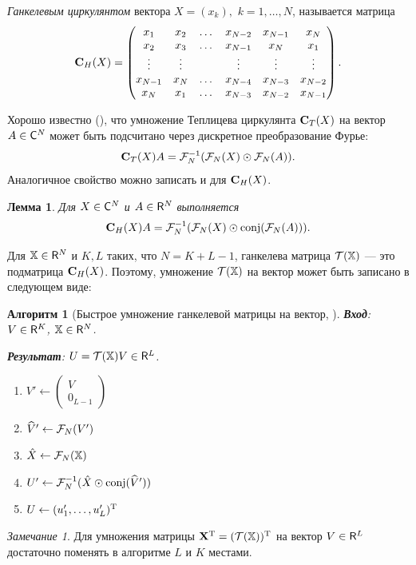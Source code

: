 \documentclass[12pt, specialist, subf,href,colorlinks=true,substylefile = spbu.rtx]{disser}
\newtheorem{algorithm}{Алгоритм}
\newtheorem{lemma}{Лемма}
\theoremstyle{remark}
\newtheorem{remark}{Замечание}
\theoremstyle{definition}
\begin{document}
\emph{Ганкелевым циркулянтом} вектора $X=(x_k),$ $k = 1, \ldots, N$, называется матрица
\begin{equation*}
\mathbf{C}_H(X) = \begin{pmatrix}
x_1 & x_2 & \dots & x_{N-2} & x_{N-1} & x_N \\ 
x_2 & x_3 & \dots & x_{N-1} & x_N & x_1 \\ 
\vdots & \vdots &  & \vdots  & \vdots & \vdots \\ 
x_{N-1} & x_N & \dots & x_{N-4} & x_{N-3} & x_{N-2} \\ 
x_N & x_1 & \dots & x_{N-3} & x_{N-2} & x_{N-1}
\end{pmatrix}.
\end{equation*}

Хорошо известно (\cite{Korobeynikov2010}), что умножение Теплицева циркулянта $\mathbf{C}_T(X)$ на вектор $A \in \mathsf{C}^N$ может быть подсчитано через дискретное преобразование Фурье:
\begin{equation*}
\mathbf{C}_T(X) A = \mathcal{F}_N^{-1}(\mathcal{F}_N(X) \odot \mathcal{F}_N(A)).
\end{equation*}
Аналогичное свойство можно записать и для $\mathbf{C}_H(X)$.
\begin{lemma}{\cite{Golyandina2013a}}
	Для $X \in \mathsf{C}^N$ и $A \in \mathsf{R}^N$ выполняется
	\begin{equation*}
	\mathbf{C}_H(X) A = \mathcal{F}_N^{-1}(\mathcal{F}_N(X) \odot \text{conj}(\mathcal{F}_N(A))).
	\end{equation*}
\end{lemma}

Для $\mathbb{X} \in \mathsf{R}^N$ и $K, L$ таких, что $N = K + L - 1$, ганкелева матрица $\mathcal{T}(\mathbb{X})$ --- это подматрица $\mathbf{C}_H(X)$. Поэтому, умножение $\mathcal{T}(\mathbb{X})$ на вектор может быть записано в следующем виде:

\begin{algorithm}[Быстрое умножение ганкелевой матрицы на вектор, \cite{Golyandina2013a}]\label{fastprod}
	\textbf{Вход}: $V \in \mathsf{R}^K$, $\mathbb{X} \in \mathsf{R}^N$.
	
	\textbf{Результат}:
	$U = \mathcal{T}(\mathbb{X}) V \in \mathsf{R}^L$.
	
	\begin{enumerate}
		\item
		$V' \leftarrow \begin{pmatrix}
		V \\ 
		0_{L - 1}
		\end{pmatrix} $
		\item
		$\widehat V' \leftarrow \mathcal{F}_N(V')$
		\item
		$\hat X \leftarrow \mathcal{F}_N(\mathbb{X})$
		\item
		$U' \leftarrow \mathcal{F}_N^{-1}(\hat X \odot \text{conj}(\widehat V'))$
		\item
		$U \leftarrow (u'_1, \ldots, u'_L)^{\mathrm{T}}$
	\end{enumerate}
\end{algorithm}
\begin{remark}
	Для умножения матрицы $\mathbf{X}^{\mathrm{T}} = (\mathcal{T}(\mathbb{X}))^{\mathrm{T}}$ на вектор $V \in \mathsf{R}^L$ достаточно поменять в алгоритме $L$ и $K$ местами.
\end{remark}
\end{document}
